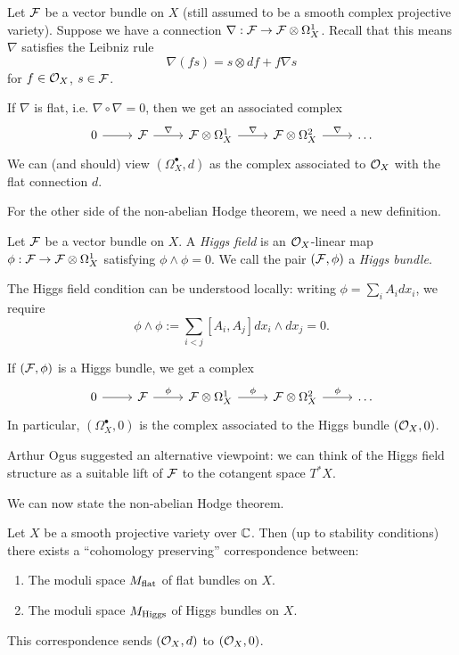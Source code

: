 \documentclass{amsart}
\begin{document}
Let $\mathcal{F}$ be a vector bundle on $X$ (still assumed to be a smooth complex projective variety).
Suppose we have a connection $\nabla: \mathcal{F} \to \mathcal{F} \otimes \Omega^1_X$.
Recall that this means $\nabla$ satisfies the Leibniz rule
\[
	\nabla(fs) = s \otimes df + f \nabla s
\]
for $f \in \mathcal{O}_X$, $s \in \mathcal{F}$.

If $\nabla$ is flat, i.e. $\nabla \circ \nabla = 0$, then we get an associated complex
\[
	\begin{tikzcd}
		0 \rar & \Fc \rar["\nabla"] & \Fc \otimes \Omega^1_X \rar["\nabla"] & \Fc \otimes \Omega^2_X \rar["\nabla"] & \dots
	\end{tikzcd}
\]
We can (and should) view $(\Omega_X^\bullet, d)$ as the complex associated to $\mathcal{O}_X$ with the flat connection $d$.

For the other side of the non-abelian Hodge theorem, we need a new definition.

\begin{dfn}
	Let $\mathcal{F}$ be a vector bundle on $X$.
	A \emph{Higgs field} is an $\mathcal{O}_X$-linear map $\phi: \mathcal{F} \to \mathcal{F} \otimes \Omega^1_X$ satisfying $\phi \wedge \phi = 0$.
	We call the pair $(\mathcal{F}, \phi)$ a \emph{Higgs bundle}.
\end{dfn}

The Higgs field condition can be understood locally: writing $\phi = \sum_i A_i dx_i$, we require
\[
	\phi \wedge \phi := \sum_{i < j} [A_i, A_j] dx_i \wedge dx_j = 0.
\]

If $(\mathcal{F}, \phi)$ is a Higgs bundle, we get a complex
\[
	\begin{tikzcd}
		0 \rar & \Fc \rar["\phi"] & \Fc \otimes \Omega^1_X \rar["\phi"] & \Fc \otimes \Omega^2_X \rar["\phi"] & \dots
	\end{tikzcd}
\]
In particular, $(\Omega_X^\bullet, 0)$ is the complex associated to the Higgs bundle $(\mathcal{O}_X, 0)$.

\begin{rmk}
	Arthur Ogus suggested an alternative viewpoint: we can think of the Higgs field structure as a suitable lift of $\mathcal{F}$ to the cotangent space $T^* X$.
\end{rmk}

We can now state the non-abelian Hodge theorem.

\begin{thm}
	Let $X$ be a smooth projective variety over $\mathbb{C}$.
	Then (up to stability conditions) there exists a ``cohomology preserving'' correspondence between:
	\begin{enumerate}
		\item The moduli space $M_{\mathrm{flat}}$ of flat bundles on $X$.
		\item The moduli space $M_{\mathrm{Higgs}}$ of Higgs bundles on $X$.
	\end{enumerate}
	This correspondence sends $(\mathcal{O}_X, d)$ to $(\mathcal{O}_X, 0)$.
\end{thm}
\end{document}
